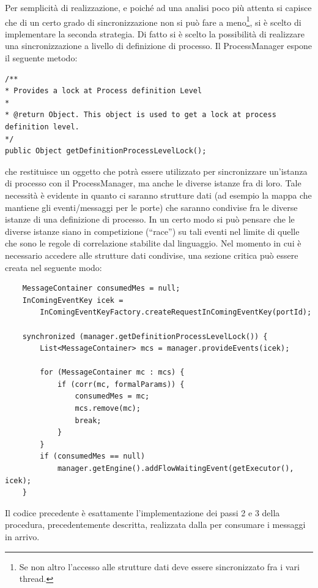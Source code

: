 Per semplicità di realizzazione, e poiché ad una analisi poco più attenta si
capisce che di un certo grado di sincronizzazione non si può fare a
meno\footnote{Se non altro l'accesso alle strutture dati deve essere
sincronizzato fra i vari thread.}, si \`e scelto di implementare la seconda
strategia. Di fatto si \`e scelto la possibilità di realizzare una
sincronizzazione a livello di definizione di processo. Il ProcessManager espone
il seguente metodo:
\begin{lstlisting}
/**
* Provides a lock at Process definition Level
* 
* @return Object. This object is used to get a lock at process definition level.
*/
public Object getDefinitionProcessLevelLock();
\end{lstlisting}
che restituisce un oggetto che potrà essere utilizzato per sincronizzare
un'istanza di processo con il ProcessManager, ma anche le diverse istanze fra
di loro. Tale necessità \`e evidente in quanto ci saranno strutture dati (ad
esempio la mappa che mantiene gli eventi/messaggi per le porte) che saranno 
condivise fra le diverse istanze di una definizione di processo. In un certo
modo  si può pensare che le diverse istanze siano in competizione (``race'') su
tali eventi nel limite di quelle che sono le regole di correlazione stabilite
dal  linguaggio. Nel momento in cui è necessario accedere alle strutture dati
condivise, una sezione critica può essere creata nel seguente modo:
\label{cod:wait}
\begin{lstlisting}
   	MessageContainer consumedMes = null;
	InComingEventKey icek = 
		InComingEventKeyFactory.createRequestInComingEventKey(portId);

	synchronized (manager.getDefinitionProcessLevelLock()) {
		List<MessageContainer> mcs = manager.provideEvents(icek);

		for (MessageContainer mc : mcs) {
			if (corr(mc, formalParams)) {
				consumedMes = mc;
				mcs.remove(mc); 
				break;
			}
     	}
		if (consumedMes == null)
			manager.getEngine().addFlowWaitingEvent(getExecutor(), icek);
   	}
\end{lstlisting}

Il codice precedente è esattamente l'implementazione dei passi 2 e 3 della
procedura, precedentemente descritta, realizzata dalla 
per consumare i messaggi in arrivo.
\\

